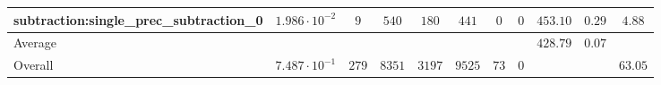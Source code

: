 \begin{tabular}{|l|c|c|c|c|c|c|c|c|c|c|}
subtraction:single\_prec\_subtraction\_0         & $ 1.986 \cdot 10^{-2} $ & $ 9      $ & $ 540  $ & $ 180  $ & $ 441   $ & $ 0  $ & $ 0 $ & $ 453.10      $ & $ 0.29    $ & $ 4.88    $ \\
\hline
Average                                          & $                     $ & $        $ & $      $ & $      $ & $       $ & $    $ & $   $ & $ 428.79      $ & $ 0.07    $ & $         $ \\
\hline
Overall                                          & $ 7.487 \cdot 10^{-1} $ & $ 279    $ & $ 8351 $ & $ 3197 $ & $ 9525  $ & $ 73 $ & $ 0 $ & $             $ & $         $ & $ 63.05   $ \\
\hline
\end{tabular}
